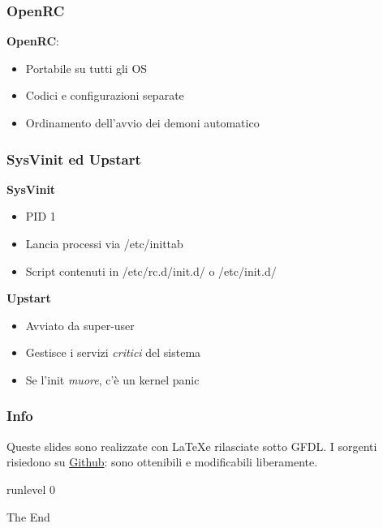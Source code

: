 \documentclass{beamer}
\begin{document}

\begin{frame}
	\frametitle{OpenRC}
	\textbf{OpenRC}:
	\begin{itemize}
		\item Portabile su tutti gli OS
		\item Codici e configurazioni separate
		\item Ordinamento dell'avvio dei demoni automatico
	\end{itemize}	 
\end{frame}

\begin{frame}
	\frametitle{SysVinit ed Upstart}
	\textbf{SysVinit}
	\begin{itemize}
		\item PID 1
		\item Lancia processi via /etc/inittab
		\item Script contenuti in /etc/rc.d/init.d/ o /etc/init.d/
	\end{itemize}	
\textbf{Upstart}
\begin{itemize}
	\item Avviato da super-user
	\item Gestisce i servizi \textit{critici} del sistema
	\item Se l'init \textit{muore}, c'\`e un kernel panic
\end{itemize}
\end{frame}

\begin{frame}
	\frametitle{Info}
	Queste slides sono realizzate con \LaTeX  e rilasciate sotto GFDL.
	I sorgenti risiedono su \href{https://github.com/smlb/LinuxDay2014-smlb}{Github}: sono ottenibili e modificabili liberamente.
\end{frame}
\begin{frame}
\Huge{\centerline{runlevel 0}}
\huge{\centerline{The End}}
\end{frame}

\end{document}

